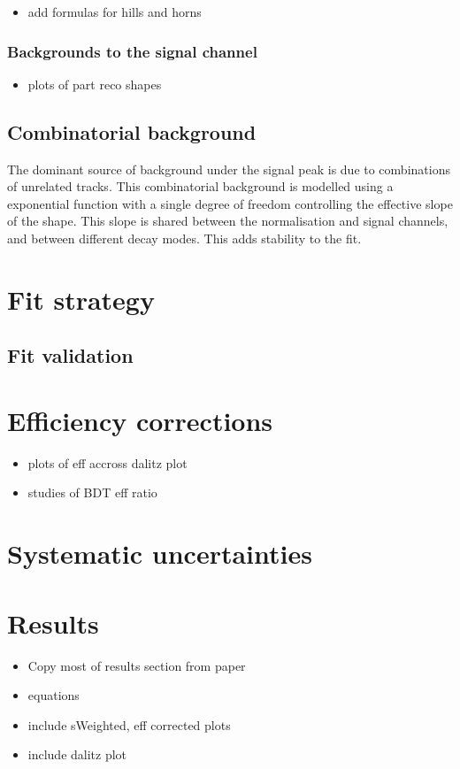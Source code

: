 {\color{Red}
\begin{itemize}
\item add formulas for hills and horns
\end{itemize}
}



\subsubsection{Backgrounds to the signal channel}

{\color{Red}
\begin{itemize}
\item plots of part reco shapes
\end{itemize}
}

\subsection{Combinatorial  background}
\label{sec:B2DsKK_combcomps}

The dominant source of background under the signal peak is due to combinations of unrelated tracks. This combinatorial background is modelled using a exponential function with a single degree of freedom controlling the effective slope of the shape. This slope is shared between the normalisation and signal channels, and between different \Dsp decay modes. This adds stability to the fit.


\section{Fit strategy}
\label{sec:B2DsKK_fitstrategy}



\subsection{Fit validation}
\label{sec:B2DsKK_fitvalidation}


\section{Efficiency corrections}
\label{sec:B2DsKK_effcorrection}

{\color{Red}
\begin{itemize}
\item plots of eff accross dalitz plot
\item studies of BDT eff ratio 
\end{itemize}
}


\section{Systematic uncertainties}
\label{sec:B2DsKK_systuncertainy}


\section{Results}
\label{sec:B2DsKK_results}



{\color{Red}
\begin{itemize}
\item Copy most of results section from paper
\item equations
\item include sWeighted, eff corrected plots
\item include dalitz plot
\end{itemize}
}
